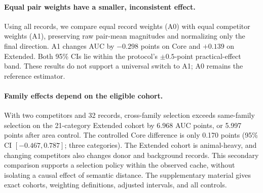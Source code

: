 \paragraph{Equal pair weights have a smaller, inconsistent effect.}
Using all records, we compare equal record weights (A0) with equal
competitor weights (A1), preserving raw pair-mean magnitudes and normalizing
only the final direction. A1 changes AUC by \(-0.298\) points on Core
and \(+0.139\) on Extended. Both 95\% CIs lie within the protocol's
\(\pm0.5\)-point practical-effect band. These results do not support a
universal switch to A1; A0 remains the reference estimator.

\paragraph{Family effects depend on the eligible cohort.}
With two competitors and 32 records, cross-family selection exceeds
same-family selection on the 21-category Extended cohort by 6.968 AUC
points, or 5.997 points after area control. The controlled Core difference
is only 0.170 points (95\% CI \([-0.467,0.787]\); three categories).
The Extended cohort is animal-heavy, and changing competitors also changes
donor and background records. This secondary comparison supports a
selection policy within the observed cache, without isolating a causal
effect of semantic distance. The supplementary material gives exact
cohorts, weighting definitions, adjusted intervals, and all controls.

